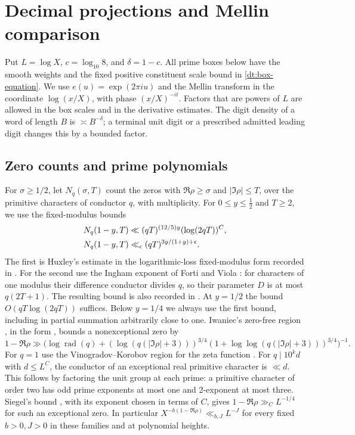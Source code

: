 \documentclass[11pt,a4paper]{article}
\theoremstyle{paperplain}
\numberwithin{equation}{section}
\begin{document}
\section{Decimal projections and Mellin comparison}
\label{dt:analytic-section}

Put \(L=\log X\), \(c=\log_{10}8\), and \(\delta=1-c\).
All prime boxes below have the smooth weights and the fixed positive
constituent scale bound in \eqref{dt:box-equation}. We use \(e(u)=\exp(2\pi i u)\)
and the Mellin transform in the coordinate \(\log(x/X)\), with phase
\((x/X)^{-it}\). Factors that are powers of \(L\) are allowed in the box
scales and in the derivative estimates. The digit density of a word of
length \(B\) is \(\asymp B^{-\delta}\); a terminal unit digit or a prescribed
admitted leading digit changes this by a bounded factor.

\subsection{Zero counts and prime polynomials}

For \(\sigma\geq 1/2\), let \(N_q(\sigma,T)\) count the zeros with
\(\Re\rho\geq\sigma\) and \(|\Im\rho|\leq T\), over the primitive characters
of conductor \(q\), with multiplicity. For \(0\leq y\leq\tfrac12\)
and \(T\geq2\), we use the fixed-modulus bounds
\begin{align}\label{dt:analytic-density}
 N_q(1-y,T)&\ll (qT)^{(12/5)y}(\log(2qT))^C,\notag\\
 N_q(1-y,T)&\ll_\epsilon(qT)^{3y/(1+y)+\epsilon}.
\end{align}
The first is Huxley's estimate \cite{Huxley} in the logarithmic-loss
fixed-modulus form recorded in \cite[(3.3)]{BanksShparlinski2019}. For the second
use the Ingham exponent of Forti and Viola \cite[(2.5), p.~386]{FortiViola1973}:
for characters of one modulus their difference conductor divides $q$, so
their parameter $D$ is at most $q(2T+1)$. The resulting bound is also
recorded in \cite[(1.4)]{ChenGuptaLi2026}. At \(y=1/2\) the bound
\(O(qT\log(2qT))\) suffices. Below \(y=1/4\) we always use the first
bound, including in partial summation arbitrarily close to one.
Iwaniec's zero-free region \cite[Theorem~2]{Iwaniec1974}, in the
form \cite[(3.1)]{ThornerZaman}, bounds a nonexceptional zero by
\begin{equation}\label{dt:analytic-zero-free}
 1-\Re\rho \gg
 \big(\log \operatorname{rad}(q)
       +(\log(q(|\Im\rho|+3)))^{3/4}
        (1+\log\log(q(|\Im\rho|+3)))^{3/4}\big)^{-1}.
\end{equation}
For \(q=1\) use the Vinogradov--Korobov region for the zeta function
\cite[Theorem~1]{Ford2002ZeroFree}.
For \(q\mid 10^k d\) with \(d\le L^C\), the conductor of an exceptional
real primitive character is \(\ll d\). This follows by factoring the
unit group at each prime: a primitive character of order two has odd
prime exponents at most one and 2-exponent at most three. Siegel's
bound \cite[Theorem~5.28]{IwaniecKowalski2004}, with its exponent
chosen in terms of \(C\), gives \(1-\Re\rho\gg_C L^{-1/4}\) for such
an exceptional zero. In particular \(X^{-b(1-\Re\rho)}\ll_{b,J}L^{-J}\)
for every fixed \(b>0,J>0\) in these families and at polynomial heights.
\end{document}
